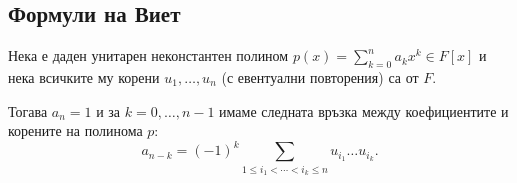 \documentclass[numbers=endperiod, DIV=15, bibliography=totocnumbered]{scrartcl}
\begin{document}
\subsection{Формули на Виет}

\begin{theorem}
  Нека е даден унитарен неконстантен полином $p(x) = \sum_{k=0}^n a_k x^k \in F[x]$ и нека всичките му корени $u_1, \ldots, u_n$ (с евентуални повторения) са от $F$.

  Тогава $a_n = 1$ и за $k = 0, \ldots, n-1$ имаме следната връзка между коефициентите и корените на полинома $p$:
  \begin{displaymath}
    a_{n-k} = {(-1)}^k \sum_{1 \leq i_1 < \cdots < i_k \leq n} u_{i_1} \ldots u_{i_k}.
  \end{displaymath}
\end{theorem}
\end{document}
